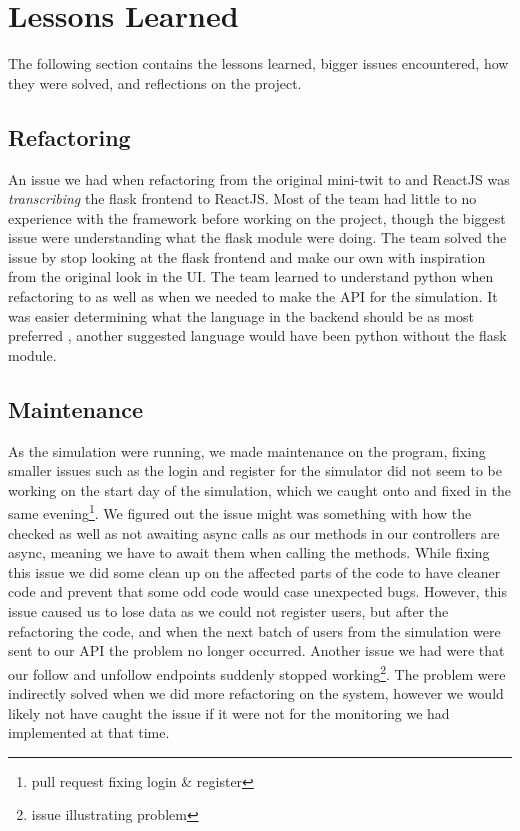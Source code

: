 \section{Lessons Learned}
\label{sec:lessons_learned}
The following section contains the lessons learned, bigger issues encountered, how they were solved, and reflections on the project.
\subsection{Refactoring}
An issue we had when refactoring from the original mini-twit to \cs and ReactJS was \textit{transcribing} the flask frontend to ReactJS. Most of the team had little to no experience with the framework before working on the project, though the biggest issue were understanding what the flask module were doing. The team solved the issue by stop looking at the flask frontend and make our own with inspiration from the original look in the UI. The team learned to understand python when refactoring to \cs as well as when we needed to make the API for the simulation.
It was easier determining what the language in the backend should be as most preferred \cs, another suggested language would have been python without the flask module.


\subsection{Maintenance}
As the simulation were running, we made maintenance on the program, fixing smaller issues such as the login and register for the simulator did not seem to be working on the start day of the simulation, which we caught onto and fixed in the same evening\footnote{pull request fixing login \& register\cite{loginIssue}}.
We figured out the issue might was something with how the checked as well as not awaiting async calls as our methods in our controllers are async, meaning we have to await them when calling the methods. While fixing this issue we did some clean up on the affected parts of the code to have cleaner code and prevent that some odd code would case unexpected bugs. However, this issue caused us to lose data as we could not register users, but after the refactoring the code, and when the next batch of users from the simulation were sent to our API the problem no longer occurred.
Another issue we had were that our follow and unfollow endpoints suddenly stopped working\footnote{issue illustrating problem\cite{issue172}}. The problem were indirectly solved when we did more refactoring on the system, however we would likely not have caught the issue if it were not for the monitoring we had implemented at that time.

